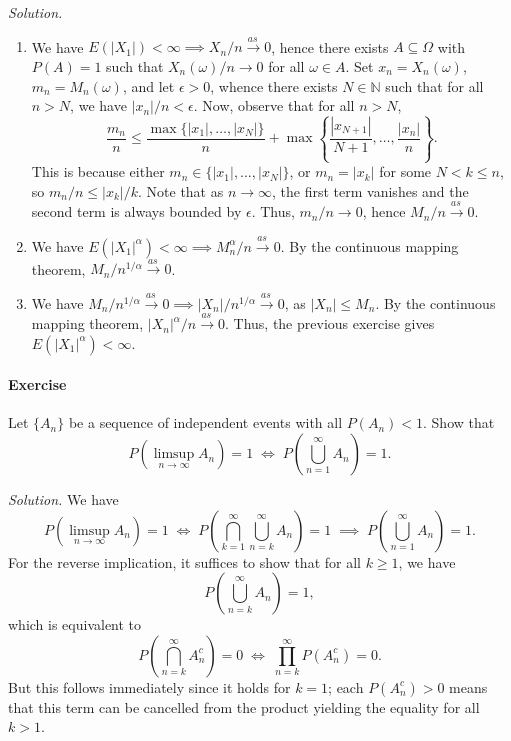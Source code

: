 \documentclass[10pt]{article}
\newcounter{prob}
\newcommand{\problem}{\stepcounter{prob}\paragraph{Exercise \arabic{prob}}}
\newcommand{\solution}{\textit{Solution.} }
\newcommand{\N}{\mathbb{N}}
\newcommand{\toas}{\overset{as\,}{\longrightarrow}}
\begin{document}
    \solution \begin{enumerate}
        \item We have $E(|X_1|) < \infty \implies X_n/n \toas 0$, hence there exists
        $A \subseteq \Omega$ with $P(A) = 1$ such that $X_n(\omega) / n \to 0$ 
        for all $\omega \in A$. Set $x_n = X_n(\omega)$, $m_n = M_n(\omega)$, and let
        $\epsilon > 0$, whence there exists $N \in \N$ such that for all $n > N$,
        we have $|x_n|/n < \epsilon$. Now, observe that for all $n > N$, \[
            \frac{m_n}{n} \leq \frac{\max\{|x_1|, \dots, |x_N|\}}{n} +
            \max\left\{\frac{|x_{N + 1}|}{N + 1}, \dots, \frac{|x_n|}{n}\right\}.
        \] This is because either $m_n \in \{|x_1|, \dots, |x_N|\}$, or $m_n = |x_k|$
        for some $N < k \leq n$, so $m_n / n \leq |x_k| / k$. Note that as $n \to
        \infty$, the first term vanishes and the second term is always bounded by
        $\epsilon$. Thus, $m_n / n \to 0$, hence $M_n/n \toas 0$.

        \item We have $E(|X_1|^\alpha) < \infty \implies M_n^\alpha / n \toas 0$. By
        the continuous mapping theorem, $M_n / n^{1/\alpha} \toas 0$.

        \item We have $M_n / n^{1/\alpha} \toas 0 \implies |X_n|/n^{1/\alpha} \toas 0$,
        as $|X_n| \leq M_n$. By the continuous mapping theorem, $|X_n|^\alpha/n \toas
        0$. Thus, the previous exercise gives $E(|X_1|^\alpha) < \infty$.
    \end{enumerate}


    \problem Let $\{A_n\}$ be a sequence of independent events with all $P(A_n) < 1$.
    Show that \[
        P(\limsup_{n \to \infty} A_n) = 1 \;\iff\; P\left(\bigcup_{n = 1}^\infty
        A_n\right) = 1.
    \]

    \solution We have \[
        P(\limsup_{n \to \infty} A_n) = 1 \;\iff\; P\left(\bigcap_{k = 1}^\infty
        \bigcup_{n = k}^\infty A_n\right) = 1 \;\implies\; P\left(\bigcup_{n =
        1}^\infty A_n\right) = 1.
    \] For the reverse implication, it suffices to show that for all $k \geq 1$, we
    have \[
        P\left(\bigcup_{n = k}^\infty A_n\right) = 1,
    \] which is equivalent to \[
        P\left(\bigcap_{n = k}^\infty A_n^c\right) = 0 \;\iff\;
        \prod_{n = k}^\infty P(A_n^c) = 0.
    \] But this follows immediately since it holds for $k = 1$; each $P(A_n^c) > 0$
    means that this term can be cancelled from the product yielding the equality for
    all $k > 1$.
\end{document}
